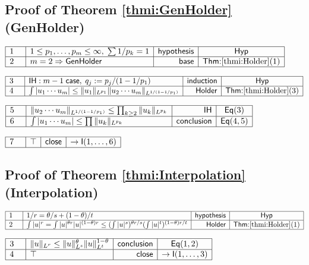 \documentclass[11pt,reqno]{amsart}
\begin{document}
	\subsection*{Proof of Theorem \protect\ref{thmi:GenHolder} (\textsf{GenHolder})}
	\noindent$\begin{array}{|m{0.5cm}|l|r|c|}
	\hline
	1 & 1\le p_{1},\dots,p_{m}\le\infty,\;\sum 1/p_{k}=1 & \mathsf{hypothesis} & \mathsf{Hyp} \\ \hline
	2 & m=2\Rightarrow\mathsf{GenHolder} & \mathsf{base} & \textsf{Thm:}\ref{thmi:Holder}(1) \\ \hline
	\end{array}$
	\par\nointerlineskip\noindent$\begin{array}{|m{0.5cm}|l|r|c|}
	\hline
	3 & \mathsf{IH}:m-1\;\mathsf{case},\;q_{j}:=p_{j}/(1-1/p_{1}) & \mathsf{induction} & \mathsf{Hyp} \\ \hline
	4 & \int|u_{1}\cdots u_{m}|\le\|u_{1}\|_{L^{p_{1}}}\|u_{2}\cdots u_{m}\|_{L^{1/(1-1/p_{1})}} & \mathsf{Holder} & \textsf{Thm:}\ref{thmi:Holder}(3) \\ \hline
	\end{array}$
	\par\nointerlineskip\noindent$\begin{array}{|m{0.5cm}|l|r|c|}
	\hline
	5 & \|u_{2}\cdots u_{m}\|_{L^{1/(1-1/p_{1})}}\le\prod_{k\ge2}\|u_{k}\|_{L^{p_{k}}} & \mathsf{IH} & \mathsf{Eq}(3) \\ \hline
	6 & \int|u_{1}\cdots u_{m}|\le\prod\|u_{k}\|_{L^{p_{k}}} & \mathsf{conclusion} & \mathsf{Eq}(4,5) \\ \hline
	\end{array}$
	\par\nointerlineskip\noindent$\begin{array}{|m{0.5cm}|l|r|c|}
	\hline
	7 & \top & \mathsf{close} & \to\mathsf{I}(1,\dots,6) \\ \hline
	\end{array}$
	\medskip
	
	\subsection*{Proof of Theorem \protect\ref{thmi:Interpolation} (\textsf{Interpolation})}
	\noindent$\begin{array}{|m{0.5cm}|l|r|c|}
	\hline
	1 & 1/r=\theta/s+(1-\theta)/t & \mathsf{hypothesis} & \mathsf{Hyp} \\ \hline
	2 & \int|u|^{r}=\int|u|^{\theta r}|u|^{(1-\theta)r}\le(\int|u|^{s})^{\theta r/s}(\int|u|^{t})^{(1-\theta)r/t} & \mathsf{Holder} & \textsf{Thm:}\ref{thmi:Holder}(1) \\ \hline
	\end{array}$
	\par\nointerlineskip\noindent$\begin{array}{|m{0.5cm}|l|r|c|}
	\hline
	3 & \|u\|_{L^{r}}\le\|u\|_{L^{s}}^{\theta}\|u\|_{L^{t}}^{1-\theta} & \mathsf{conclusion} & \mathsf{Eq}(1,2) \\ \hline
	4 & \top & \mathsf{close} & \to\mathsf{I}(1,\dots,3) \\ \hline
	\end{array}$
	\medskip
	
\end{document}
